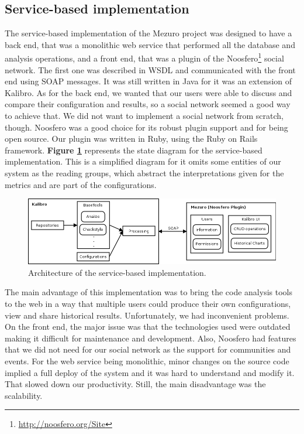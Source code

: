 \subsection{Service-based implementation}
\label{subsec:service-based-implementation}

The service-based implementation of the Mezuro project was designed to have a back end, that was a monolithic web service that performed all the database and analysis operations, and a front end, that was a plugin of the Noosfero\footnote{\url{http://noosfero.org/Site}} social network. The first one was described in WSDL and communicated with the front end using SOAP messages. It was still written in Java for it was an extension of Kalibro. As for the back end, we wanted that our users were able to discuss and compare their configuration and results, so a social network seemed a good way to achieve that. We did not want to implement a social network from scratch, though. Noosfero was a good choice for its robust plugin support and for being open source. Our plugin was written in Ruby, using the Ruby on Rails framework. \textbf{Figure \ref{fig:mezuro-noosfero-arch}} represents the state diagram for the service-based implementation. This is a simplified diagram for it omits some entities of our system as the reading groups, which abstract the interpretations given for the metrics and are part of the configurations.

\begin{figure}[htb]
  \centering
  \includegraphics[width=\textwidth]{images/mezuro-noosfero-arch.png}
  \caption{Architecture of the service-based implementation.}
  \label{fig:mezuro-noosfero-arch}
\end{figure}

The main advantage of this implementation was to bring the code analysis tools to the web in a way that multiple users could produce their own configurations, view and share historical results. Unfortunately, we had inconvenient problems. On the front end, the major issue was that the technologies used were outdated making it difficult for maintenance and development. Also, Noosfero had features that we did not need for our social network as the support for communities and events. For the web service being monolithic, minor changes on the source code implied a full deploy of the system and it was hard to understand and modify it. That slowed down our productivity. Still, the main disadvantage was the scalability.

